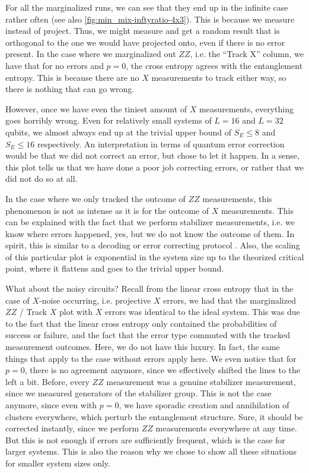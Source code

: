 For all the marginalized runs, we can see that they end up in the infinite case
rather often (see also \cref{fig:min_mix-inftyratio-4x3}). This is because we
measure instead of project. Thus, we might measure and get a random result that
is orthogonal to the one we would have projected onto, even if there is no
error present.  In the case where we marginalized out $ZZ$, i.e. the
\enquote{Track X} column, we have that for no errors and $p=0$, the cross
entropy agrees with the entanglement entropy. This is because there are no $X$
measurements to track either way, so there is nothing that can go wrong.

However, once we have even the tiniest amount of $X$ measurements, everything
goes horribly wrong.  Even for relatively small systems of $L=16$ and $L=32$
qubits, we almost always end up at the trivial upper bound of $S_E \leq 8$ and
$S_E \leq 16$ respectively.  An interpretation in terms of quantum error
correction would be that we did not correct an error, but chose to let it happen.
In a sense, this plot tells us that we have done a poor job correcting errors,
or rather that we did not do so at all.

In the case where we only tracked the outcome of $ZZ$ measurements, this
phenomenon is not as intense as it is for the outcome of $X$ measurements. 
This can be explained with the fact that we perform stabilizer
measurements, i.e. we know where errors happened, yes, but we do not know
the outcome of them. In spirit, this is similar to a decoding or error
correcting protocol \cite{roserDecodingProjectiveTransverse2023}. Also, the
scaling of this particular plot is exponential in the system size up to the
theorized critical point, where it flattens and goes to the trivial upper
bound.

What about the noisy circuits?
Recall from the linear cross entropy that in the case of
$X$-noise occurring, i.e. projective $X$ errors,
we had that the marginalized $ZZ$ / Track $X$ plot
with $X$ errors was identical to the ideal system. This was due to the fact
that the linear cross entropy only contained the probabilities of success or
failure, and the fact that the error type commuted with the tracked measurement
outcomes. Here, we do not have this luxury. In fact, the same things that apply
to the case without errors apply here. We even notice that for $p=0$, there
is no agreement anymore, since we effectively shifted the lines to the left a
bit. Before, every $ZZ$ measurement was a genuine stabilizer measurement, since
we measured generators of the stabilizer group. This is not the case anymore,
since even with $p=0$, we have sporadic creation and annihilation of clusters
everywhere, which perturb the entanglement structure.  Sure, it should be
corrected instantly, since we perform $ZZ$ measurements everywhere at any time.
But this is not enough if errors are sufficiently frequent, which is the case
for larger systems.  This is also the reason why we chose to show all these
situations for smaller system sizes only.

